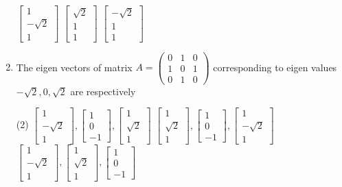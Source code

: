 \begin{enumerate}
\begin{tasks}
		\task[\textbf{b.}]$\left[\begin{array}{c}1 \\ -\sqrt{2} \\ 1\end{array}\right]$
		\task[\textbf{c.}] $\left[\begin{array}{c}\sqrt{2} \\ 1 \\ 1\end{array}\right]$
		\task[\textbf{d.}]  $\left[\begin{array}{c}-\sqrt{2} \\ 1 \\ 1\end{array}\right]$
	\end{tasks}
	\item The eigen vectors of matrix $A=\left(\begin{array}{ccc}0 & 1 & 0 \\ 1 & 0 & 1 \\ 0 & 1 & 0\end{array}\right)$ corresponding to eigen values $-\sqrt{2}, 0, \sqrt{2}$ are respectively
	 \begin{tasks}(2)
		\task[\textbf{a.}] $\left[\begin{array}{c}1 \\ -\sqrt{2} \\ 1\end{array}\right],\left[\begin{array}{c}1 \\ 0 \\ -1\end{array}\right],\left[\begin{array}{c}1 \\ \sqrt{2} \\ 1\end{array}\right]$
		\task[\textbf{b.}]$\left[\begin{array}{c}1 \\ \sqrt{2} \\ 1\end{array}\right],\left[\begin{array}{c}1 \\ 0 \\ -1\end{array}\right],\left[\begin{array}{c}1 \\ -\sqrt{2} \\ 1\end{array}\right]$
		\task[\textbf{c.}]$\left[\begin{array}{c}1 \\ -\sqrt{2} \\ 1\end{array}\right],\left[\begin{array}{c}1 \\ \sqrt{2} \\ 1\end{array}\right],\left[\begin{array}{c}1 \\ 0 \\ -1\end{array}\right]$

\end{tasks}
\end{enumerate}
